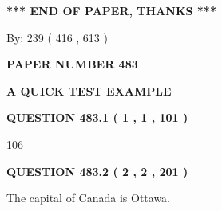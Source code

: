 \documentclass[12pt]{article}
\begin{document}
 
 
 
   
   
 \vspace{0.2in}
 
   
   
   
   
\vspace{1.0in} 
{\textbf{\large{ *** END OF PAPER, THANKS *** }}} 
   
   
\hspace{1.0in} By: 
 239 ( 416 ,  613 )
   
   
   
   
\newpage 
\setcounter{page}{ 
   483001 } 
   
   
   
   
 {\textbf{ \Large{ PAPER NUMBER  483  }}}
   
   
\vspace{0.2in}
   
   
   
   
   
   
 \vspace{0.2in}
{\LARGE {\textbf{ A QUICK TEST EXAMPLE}}}
   
   
  
\vspace{0.2in}
  
{\textbf{\Large{QUESTION
483.1 
 ( 1 , 1 , 101 )
}}}
  
  
 
 
\noindent{}

106
 
 
  
\vspace{0.2in}
  
{\textbf{\Large{QUESTION
483.2 
 ( 2 , 2 , 201 )
}}}
  
  
 
 
\noindent{}
 
 
The capital of Canada is Ottawa.
 
 
 
 
   
   
 \vspace{0.2in}
 
   
   
   
   
\end{document}
